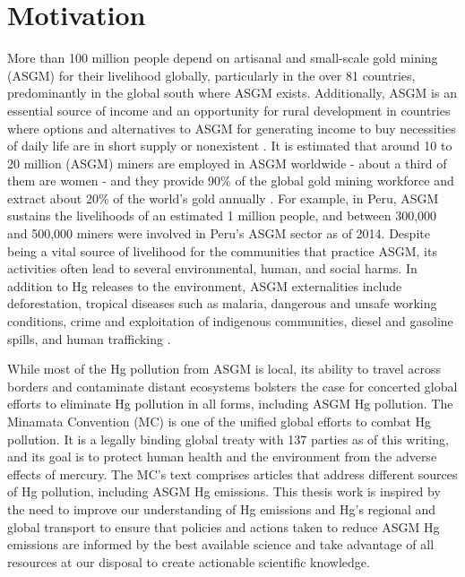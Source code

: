 \section{Motivation}
\begin{flushleft}
More than 100 million people depend on artisanal and small-scale gold mining (ASGM) for their livelihood globally, particularly in the over 81 countries, predominantly in the global south where ASGM exists\cite{planetgold_planetgold_2021}. Additionally, ASGM is an essential source of income and an opportunity for rural development in countries where options and alternatives to ASGM for generating income to buy necessities of daily life are in short supply or nonexistent \cite{planetgold_planetgold_2021}. It is estimated that around 10 to 20 million (ASGM) miners are employed in ASGM worldwide - about a third of them are women - and they provide 90\% of the global gold mining workforce and extract about 20\% of the world's gold annually \cite{planetgold_planetgold_2021}. For example, in Peru, ASGM sustains the livelihoods of an estimated 1 million people, and between 300,000 and 500,000 miners were involved in Peru's ASGM sector as of 2014. Despite being a vital source of livelihood for the communities that practice ASGM, its activities often lead to several environmental, human, and social harms. In addition to Hg releases to the environment, ASGM externalities include deforestation, tropical diseases such as malaria, dangerous and unsafe working conditions, crime and exploitation of indigenous communities, diesel and gasoline spills, and human trafficking \cite{usaid_usaid_2020}. 
\end{flushleft}
\begin{flushleft}
While most of the Hg pollution from ASGM is local, its ability to travel across borders and contaminate distant ecosystems bolsters the case for concerted global efforts to eliminate Hg pollution in all forms, including ASGM Hg pollution. The Minamata Convention (MC) is one of the unified global efforts to combat Hg pollution. It is a legally binding global treaty with 137 parties as of this writing, and its goal is to protect human health and the environment from the adverse effects of mercury. The MC's text comprises articles that address different sources of Hg pollution, including ASGM Hg emissions\cite{unep_minamata_2013}. This thesis work is inspired by the need to improve our understanding of Hg emissions and Hg's regional and global transport to ensure that policies and actions taken to reduce ASGM Hg emissions are informed by the best available science and take advantage of all resources at our disposal to create actionable scientific knowledge.
\end{flushleft}


